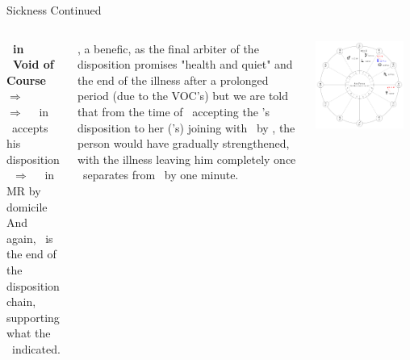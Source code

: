 \begin{frame}[t]{Sickness Continued}
\begin{columns}[T, onlytextwidth]

\textbf{\Mercury\ in \Aries\ Void of Course} $\Rightarrow$ \Taurus \\
$\Rightarrow$ \Sextile\ \Venus\ in \Taurus\ accepts his disposition\footnotemark[1] \\
\Venus\ $\Rightarrow$ \Sextile\ \Jupiter\ in \Taurus\, MR by domicile \\
And again, \Jupiter\ is the end of the disposition chain, supporting what the \Moon\ indicated.
\vspace{0.2cm}

\Jupiter, a benefic, as the final arbiter of the disposition promises "health and quiet" and the end of the illness after a prolonged period (due to the VOC's) but we are told that from the time of \Venus\ accepting the \Moon's disposition to her (\Venus's) joining with \Jupiter\ by \Sextile, the person would have gradually strengthened, with the illness leaving him completely once \Venus\ separates from \Jupiter\ by one minute.

\begin{center}
{\includegraphics[width=0.9\textwidth]{charts/21b-chart-sickness}} \\
\vspace{-0.2cm}
\end{center}
\end{columns}
\end{frame}
